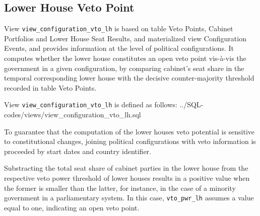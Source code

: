 \subsection{Lower House Veto Point}\label{view_configuration_vto_lh}
View \texttt{view\_configuration\_vto\_lh} is based on table Veto Points, Cabinet Portfolios and Lower House Seat Results, and materialized view Configuration Events, and provides information at the level of political configurations.
It computes whether the lower house constitutes an open veto point vis-\`{a}-vis the government in a given configuration, by comparing cabinet's seat share in the temporal corresponding lower house with the decisive counter-majority threshold recorded in table Veto Points. 

View \texttt{view\_configuration\_vto\_lh} is defined as follows:
%
{../SQL-codes/views/view_configuration_vto_lh.sql}

To guarantee that the computation of the lower houses veto potential is sensitive to constitutional changes, joining political configurations with veto information is proceeded by start dates and country identifier. 

Substracting the total seat share of cabinet parties in the lower house from the respective veto power threshold of lower houses results in a positive value when the former is smaller than the latter, for instance, in the case of a minority government in a parliamentary system. 
In this case, \texttt{vto\_pwr\_lh} assumes a value equal to one, indicating an open veto point.
